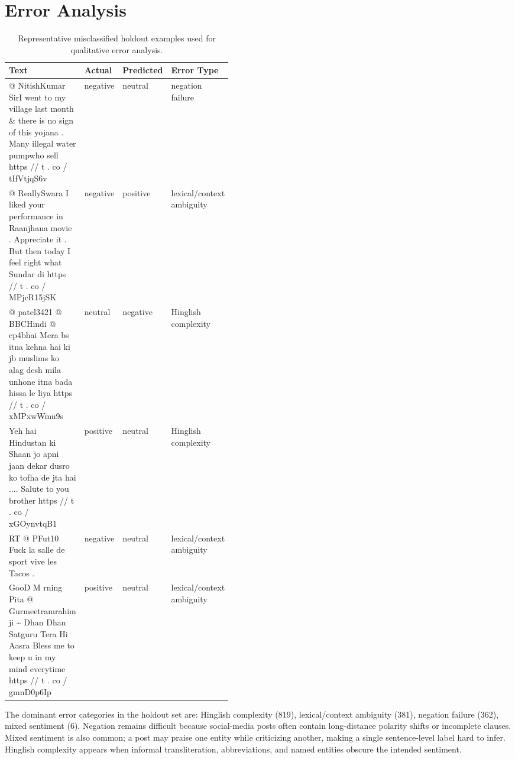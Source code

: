\documentclass[11pt,a4paper]{article}
\begin{document}
\section{Error Analysis}
\begin{table}[htbp]
\centering
\caption{Representative misclassified holdout examples used for qualitative error analysis.}
\label{tab:error-examples}
\small
\begin{tabular}{p{0.44\linewidth}lll}
\toprule
Text & Actual & Predicted & Error Type \\
\midrule
@ NitishKumar SirI went to my village last month \& there is no sign of this yojana . Many illegal water pumpwho sell  https // t . co / tIfVtjqS6v & negative & neutral & negation failure \\
@ ReallySwara I liked your performance in Raanjhana movie . Appreciate it . But then today I feel right what Sundar di  https // t . co / MPjcR15jSK & negative & positive & lexical/context ambiguity \\
@ patel3421 @ BBCHindi @ cp4bhai Mera bs itna kehna hai ki jb muslims ko alag desh mila unhone itna bada hissa le liya  https // t . co / xMPxwWmu9s & neutral & negative & Hinglish complexity \\
Yeh hai Hindustan ki Shaan jo apni jaan dekar dusro ko tofha de jta hai .... Salute to you brother  https // t . co / xGOynvtqB1 & positive & neutral & Hinglish complexity \\
RT @ PFut10 Fuck la salle de sport vive les Tacos . & negative & neutral & lexical/context ambiguity \\
GooD M  rning Pita @ Gurmeetramrahim ji \textasciitilde{} Dhan Dhan Satguru Tera Hi Aasra  Bless me to keep u in my mind everytime  https // t . co / gmnD0p6Ip & positive & neutral & lexical/context ambiguity \\
\bottomrule
\end{tabular}
\end{table}

The dominant error categories in the holdout set are: Hinglish complexity (819), lexical/context ambiguity (381), negation failure (362), mixed sentiment (6). Negation remains difficult because social-media posts often contain long-distance polarity shifts or incomplete clauses. Mixed sentiment is also common; a post may praise one entity while criticizing another, making a single sentence-level label hard to infer. Hinglish complexity appears when informal transliteration, abbreviations, and named entities obscure the intended sentiment.
\end{document}
